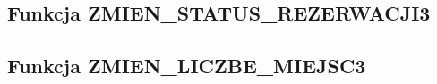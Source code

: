 \documentclass[a4paper, 11pt]{article}
\begin{document}
    \newpage

    \subsection{Funkcja ZMIEN\_STATUS\_REZERWACJI3}
    

    \newpage

    \subsection{Funkcja ZMIEN\_LICZBE\_MIEJSC3}
    
\end{document}
